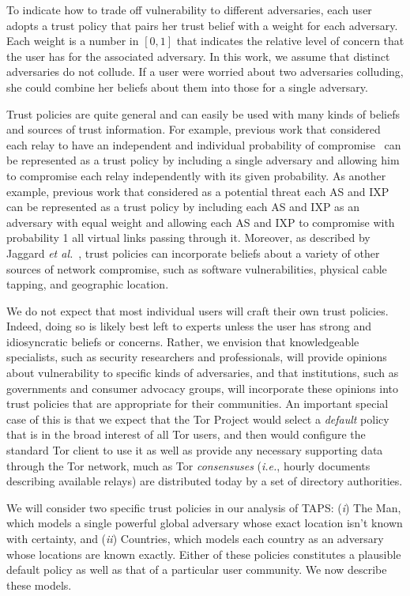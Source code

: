 \documentclass[conference]{styles/IEEEtran}
\newcommand{\etal}{\emph{et al.}}
\newcommand{\ie}{\emph{i.e.}}
\newcommand{\ps}{TAPS\xspace}
\begin{document}
To indicate how to trade off vulnerability to different adversaries, each user adopts a trust
policy that pairs her trust belief with a weight for each adversary. Each weight is a number in
$[0, 1]$ that indicates the relative level of concern that the user has for the associated
adversary. In this work, we assume that distinct adversaries do not collude.  If a user were worried
about two  adversaries colluding, she could combine her beliefs about them into those for a single
adversary. 

Trust policies are quite general and can easily be used with many kinds of beliefs
and sources of trust information. For example, previous work that considered each relay to have
an independent and individual probability of compromise~\cite{jsdm11ccs,trusted-set} can be
represented as a trust policy by including a single adversary and allowing him to compromise
each relay independently with its given probability. As
another example, previous work that considered as a potential threat each AS and
IXP~\cite{feamster:wpes2004,tor-as,juen-masters,murdoch:pet2007} can be represented as a trust
policy by including each AS and IXP as an adversary with equal weight and allowing each AS and IXP
to compromise with probability 1 all virtual links passing through it. Moreover, as described
by Jaggard \etal~\cite{trustrep-popets14}, trust policies can incorporate beliefs about a variety
of other sources of network compromise, such as software vulnerabilities, physical cable tapping,
and geographic location.

We do not expect that most individual users will craft their own trust policies. Indeed, doing so
is likely best left to experts unless the user has strong and idiosyncratic beliefs or concerns.
Rather, we envision that knowledgeable specialists, such as security researchers and professionals,
will provide
opinions about vulnerability to specific kinds of adversaries, and that institutions, such as
governments and consumer advocacy groups, will incorporate these opinions into trust policies that
are appropriate for their communities. An important special case of this is that we expect that the
Tor Project would select a \emph{default} policy that is in the broad interest of all Tor users, and
then would configure the standard Tor client to use it as well as provide any necessary supporting
data through the Tor network, much as Tor \emph{consensuses} (\ie{}, hourly documents describing
available relays) are distributed today by a set of directory authorities.

We will consider two specific trust policies in our analysis of \ps: (\emph{i}) \textsf{The Man},
which models a single powerful global adversary whose exact location isn't known with certainty,
and (\emph{ii}) \textsf{Countries}, which models each country as an adversary whose
locations are known exactly. Either of these policies constitutes a plausible default policy as well
as that of a particular user community. We now describe these models.
\end{document}
